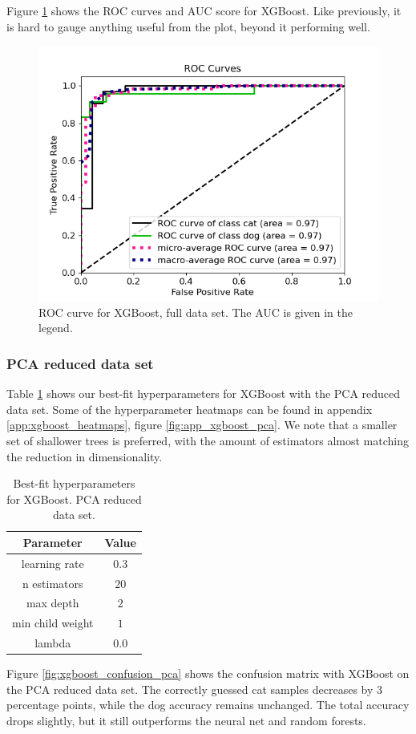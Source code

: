 \documentclass[a4paper]{article}
\begin{document}
Figure \ref{fig:xgboost_roc_nonpca} shows the ROC curves and AUC score for XGBoost. Like previously, it is hard to gauge anything useful from the plot, beyond it performing well.
\begin{figure}[H]
	\centering
	\includegraphics[scale=0.5]{../figures/xgboost/roc_nbins200_pca0_seed4155_ts0.20.png}
	\caption{ROC curve for XGBoost, full data set. The AUC is given in the legend.}
	\label{fig:xgboost_roc_nonpca}
\end{figure}	

\subsubsection{PCA reduced data set}
Table \ref{tab:best_fit_xgboost_pca} shows our best-fit hyperparameters for XGBoost with the PCA reduced data set. Some of the hyperparameter heatmaps can be found in appendix \ref{app:xgboost_heatmaps}, figure \ref{fig:app_xgboost_pca}. We note that a smaller set of shallower trees is preferred, with the amount of estimators almost matching the reduction in dimensionality.

\begin{table}[H]
  \centering
  \caption{Best-fit hyperparameters for XGBoost. PCA reduced data set.}
  \label{tab:best_fit_xgboost_pca}
  \begin{tabular}{c|c}
    \hline\hline
    Parameter & Value\\\hline
    learning rate  & $0.3$\\
    n estimators &  $20$\\
    max depth &  $2$\\
    min child weight & $1$ \\
    lambda & $0.0$
    \end{tabular}
\end{table}
Figure \ref{fig:xgboost_confusion_pca} shows the confusion matrix with XGBoost on the PCA reduced data set. The correctly guessed cat samples decreases by 3 percentage points, while the dog accuracy remains unchanged. The total accuracy drops slightly, but it still outperforms the neural net and random forests.
\end{document}
